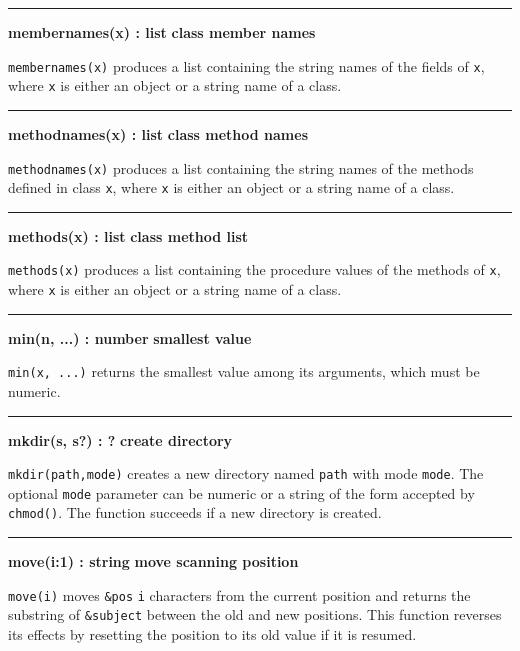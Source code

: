 \bigskip\hrule\vspace{0.1cm}
\noindent
{\bf membernames(x) : list } \hfill {\bf class member names}

\noindent
\texttt{membernames(x)} produces a list containing the string names of
the fields of \texttt{x}, where \texttt{x} is either an object or a
string name of a class.

\bigskip\hrule\vspace{0.1cm}
\noindent
{\bf methodnames(x) : list } \hfill {\bf class method names}

\noindent
\texttt{methodnames(x)} produces a list containing the string names of
the methods defined in class \texttt{x}, where \texttt{x} is either an
object or a string name of a class.

\bigskip\hrule\vspace{0.1cm}
\noindent
{\bf methods(x) : list } \hfill {\bf class method list}

\noindent
\texttt{methods(x)} produces a list containing the procedure values of
the methods of \texttt{x}, where \texttt{x} is either an object or a
string name of a class.

\bigskip\hrule\vspace{0.1cm}
\noindent
{\bf min(n, ...) : number } \hfill {\bf smallest value}

\noindent
{}\texttt{min(x, ...)} returns the smallest value among its
arguments, which must be numeric.

\bigskip\hrule\vspace{0.1cm}
\noindent
{\bf mkdir(s, s?) : ? } \hfill {\bf create directory}

\noindent
{}
\texttt{mkdir(path,mode)} creates a new directory named \texttt{path} with
mode \texttt{mode}. The optional \texttt{mode} parameter can be numeric or a
string of the form accepted by \texttt{chmod()}. The function succeeds
if a new directory is created.

\bigskip\hrule\vspace{0.1cm}
\noindent
{\bf move(i:1) : string } \hfill {\bf move scanning position}

\noindent
{}\texttt{move(i)} moves \texttt{\&pos} \texttt{i}
characters from the current position and returns the substring of
\texttt{\&subject} between the old and new positions. This function
reverses its effects by resetting the position to its old value if it
is resumed.

